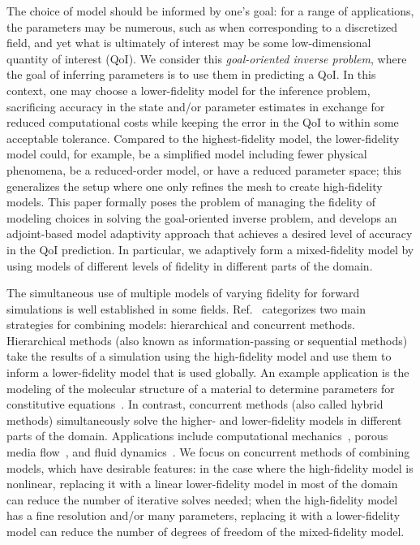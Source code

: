 \documentclass[review,sort&compress]{elsarticle}
\theoremstyle{plain} %
\theoremstyle{definition} %
\begin{document}
The choice of model should be informed by one's goal: for a range of applications, the parameters may be numerous, such as when corresponding to a discretized field, and yet what is ultimately of interest may be some low-dimensional quantity of interest (QoI). We consider this \textit{goal-oriented inverse problem}, where the goal of inferring parameters is to use them in predicting a QoI. In this context, one may choose a lower-fidelity model for the inference problem, sacrificing accuracy in the state and/or parameter estimates in exchange for reduced computational costs while keeping the error in the QoI to within some acceptable tolerance. Compared to the highest-fidelity model, the lower-fidelity model could, for example, be a simplified model including fewer physical phenomena, be a reduced-order model, or have a reduced parameter space; this generalizes the setup where one only refines the mesh to create high-fidelity models. This paper formally poses the problem of managing the fidelity of modeling choices in solving the goal-oriented inverse problem, and develops an adjoint-based model adaptivity approach that achieves a desired level of accuracy in the QoI prediction. In particular, we adaptively form a mixed-fidelity model by using models of different levels of fidelity in different parts of the domain.

The simultaneous use of multiple models of varying fidelity for forward simulations is well established in some fields. Ref.~\cite{Liuetal03} categorizes two main strategies for combining models: hierarchical and concurrent methods. Hierarchical methods (also known as information-passing or sequential methods) take the results of a simulation using the high-fidelity model and use them to inform a lower-fidelity model that is used globally. An example application is the modeling of the molecular structure of a material to determine parameters for constitutive equations~\cite{Haoetal03,Weietal04}. In contrast, concurrent methods (also called hybrid methods) simultaneously solve the higher- and lower-fidelity models in different parts of the domain. Applications include computational mechanics~\cite{Khareetal08,Prudetal08}, porous media flow~\cite{tartakovsky2008hybrid,battiato2011hybrid}, and fluid dynamics~\cite{AlexGarTar02,FatGerQua01,Garcetal99,LucKinBer02,vanOpstaletal15,WadErw90}. We focus on concurrent methods of combining models, which have desirable features: in the case where the high-fidelity model is nonlinear, replacing it with a linear lower-fidelity model in most of the domain can reduce the number of iterative solves needed; when the high-fidelity model has a fine resolution and/or many parameters, replacing it with a lower-fidelity model can reduce the number of degrees of freedom of the mixed-fidelity model.
\end{document}
